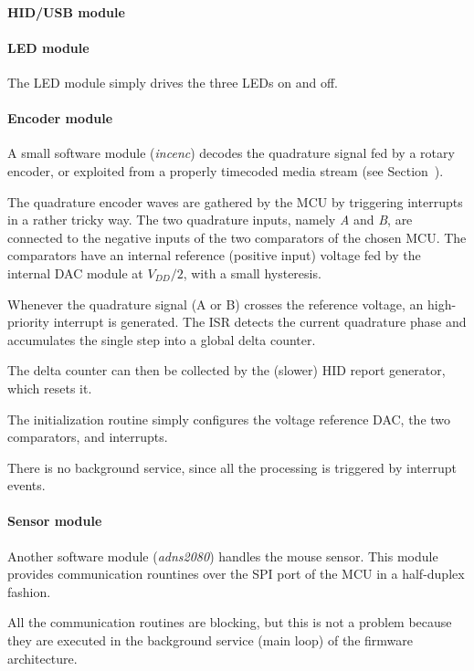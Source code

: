 \documentclass[a4paper,10pt]{article}
\begin{document}
\begin{multicols}{2}
\paragraph{HID/USB module}
\TODO


\paragraph{LED module}
The LED module simply drives the three LEDs on and off.


\paragraph{Encoder module}
A small software module (\emph{incenc}) decodes the quadrature signal fed by a
rotary encoder, or exploited from a properly timecoded media stream (see
Section~\CITEME).

The quadrature encoder waves are gathered by the MCU by triggering interrupts
in a rather tricky way. The two quadrature inputs, namely \emph{A} and
\emph{B}, are connected to the negative inputs of the two comparators of the
chosen MCU. The comparators have an internal reference (positive input)
voltage fed by the internal DAC module at $V_{DD}/2$, with a small hysteresis.

Whenever the quadrature signal (A or B) crosses the reference voltage, an
high-priority interrupt is generated. The ISR detects the current quadrature
phase and accumulates the single step into a global delta counter.

The delta counter can then be collected by the (slower) HID report generator,
which resets it.

The initialization routine simply configures the voltage reference DAC, the
two comparators, and interrupts.

There is no background service, since all the processing is triggered by
interrupt events.


\paragraph{Sensor module}
Another software module (\emph{adns2080}) handles the mouse sensor. This
module provides communication rountines over the SPI port of the MCU in a
half-duplex fashion.

All the communication routines are blocking, but this is not a problem because
they are executed in the background service (main loop) of the firmware
architecture.


\end{multicols}
\end{document}
